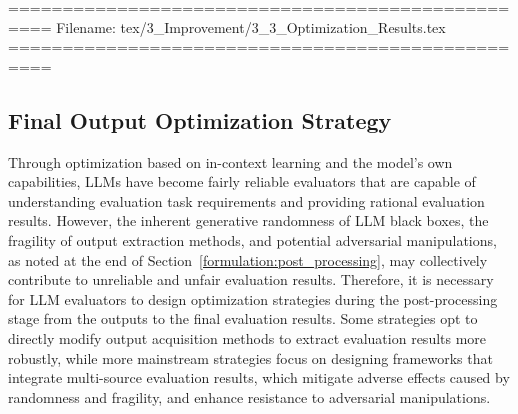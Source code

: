 ==================================================
Filename: tex/3_Improvement/3_3_Optimization_Results.tex
==================================================
\subsection{Final Output Optimization Strategy}\label{subsec:optimization_results}

Through optimization based on in-context learning and the model's own capabilities, LLMs have become fairly reliable evaluators that are capable of understanding evaluation task requirements and providing rational evaluation results. 
However, the inherent generative randomness of LLM black boxes, the fragility of output extraction methods, and potential adversarial
manipulations, as noted at the end of Section~\ref{formulation:post_processing}, may collectively contribute to unreliable and unfair evaluation results.
Therefore, it is necessary for LLM evaluators to design optimization strategies during the post-processing stage from the outputs to the final evaluation results. 
Some strategies opt to directly modify output acquisition methods to extract evaluation results more robustly, while more mainstream strategies focus on designing frameworks that integrate multi-source evaluation results, which mitigate adverse effects caused by randomness and fragility, and enhance resistance to adversarial manipulations.



